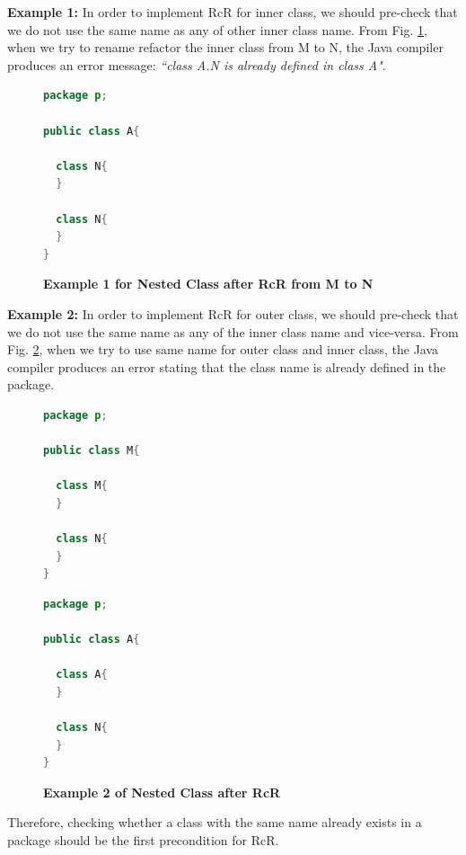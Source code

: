 \textbf{Example 1:} In order to implement RcR for inner class, we should pre-check that we do not use the same name as any of other inner class name. From Fig. \ref{fig:nestedclass1}, when we try to rename refactor the inner class from M to N, the Java compiler produces an error message: \textit{``class A.N is already defined in class A"}.

\begin{figure}[th]
\centering
\begin{minipage}[t]{0.5\linewidth}
\begin{lstlisting}[language=java, basicstyle=\scriptsize\ttfamily,frame=single]
package p;

public class A{	
    
  class N{
  }
    
  class N{
  }
} 
\end{lstlisting}
\end{minipage}
\caption{\textbf{Example 1 for Nested Class after RcR from M to N}}
\label{fig:nestedclass1}
\end{figure}


\textbf{Example 2:} In order to implement RcR for outer class, we should pre-check that we do not use the same name as any of the inner class name and vice-versa. From Fig. \ref{fig:nestedclass2}, when we try to use same name for outer class and inner class, the Java compiler produces an error stating that the class name is already defined in the package.
\begin{figure}[th]
\centering
\begin{minipage}[t]{0.45\linewidth}
\begin{lstlisting}[language=java, basicstyle=\scriptsize\ttfamily,frame=single]
package p;

public class M{	
  
  class M{
  }
	
  class N{
  }
} 
\end{lstlisting}
\end{minipage}
\hfill
\begin{minipage}[t]{0.45\linewidth}
\begin{lstlisting}[language=java, basicstyle=\scriptsize\ttfamily,frame=single]
package p;

public class A{	
    
  class A{
  }
    
  class N{
  }
} 
\end{lstlisting}
\end{minipage}
\caption{\textbf{Example 2 of Nested Class after RcR}}
\label{fig:nestedclass2}
\end{figure}

Therefore, checking whether a class with the same name already exists in a package should be the first precondition for RcR. 
   

